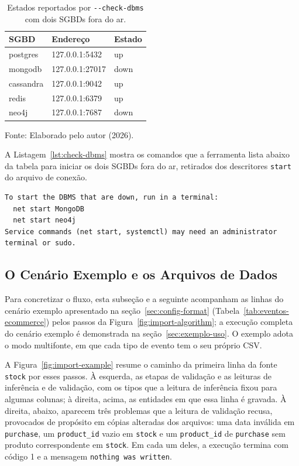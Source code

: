 \begin{table}[H]
  \caption{Estados reportados por \texttt{-{}-check-dbms} com dois SGBDs fora do ar.}
  \label{tab:check-dbms}
  \centering
  \begin{tabular}{l l l}
    \toprule
    SGBD & Endereço & Estado \\
    \midrule
    postgres  & 127.0.0.1:5432  & up   \\
    mongodb   & 127.0.0.1:27017 & down \\
    cassandra & 127.0.0.1:9042  & up   \\
    redis     & 127.0.0.1:6379  & up   \\
    neo4j     & 127.0.0.1:7687  & down \\
    \bottomrule
  \end{tabular}
  \par\vspace{4pt}
  {\footnotesize Fonte: Elaborado pelo autor (2026).}
\end{table}

A Listagem~\ref{lst:check-dbms} mostra os comandos que a ferramenta lista abaixo da
tabela para iniciar os dois SGBDs fora do ar, retirados dos descritores
\texttt{start} do arquivo de conexão.

\begin{lstlisting}[style=textstyle,caption={Comandos de inicialização mostrados por \texttt{-{}-check-dbms}.},label={lst:check-dbms}]
To start the DBMS that are down, run in a terminal:
  net start MongoDB
  net start neo4j
Service commands (net start, systemctl) may need an administrator terminal or sudo.
\end{lstlisting}

\subsection{O Cenário Exemplo e os Arquivos de Dados}
\label{sec:exemplo-linha}

Para concretizar o fluxo, esta subseção e a seguinte acompanham as linhas do cenário
exemplo apresentado na seção~\ref{sec:config-format}
(Tabela~\ref{tab:eventos-ecommerce}) pelos passos da Figura~\ref{fig:import-algorithm}; a
execução completa do cenário exemplo é demonstrada na seção~\ref{sec:exemplo-uso}. O
exemplo adota o modo multifonte, em que cada tipo de evento tem o seu próprio CSV.

A Figura~\ref{fig:import-example} resume o caminho da primeira linha da fonte
\texttt{stock} por esses passos. À esquerda, as etapas de validação e as leituras de
inferência e de validação, com os tipos que a leitura de inferência fixou para algumas
colunas; à direita, acima, as entidades em que essa linha é gravada. À direita, abaixo,
aparecem três problemas que a leitura de validação recusa, provocados de propósito em
cópias alteradas dos arquivos: uma data inválida em \texttt{purchase}, um
\texttt{product\_id} vazio em \texttt{stock} e um \texttt{product\_id} de
\texttt{purchase} sem produto correspondente em \texttt{stock}. Em cada um deles, a
execução termina com código 1 e a mensagem \texttt{nothing was written}.

